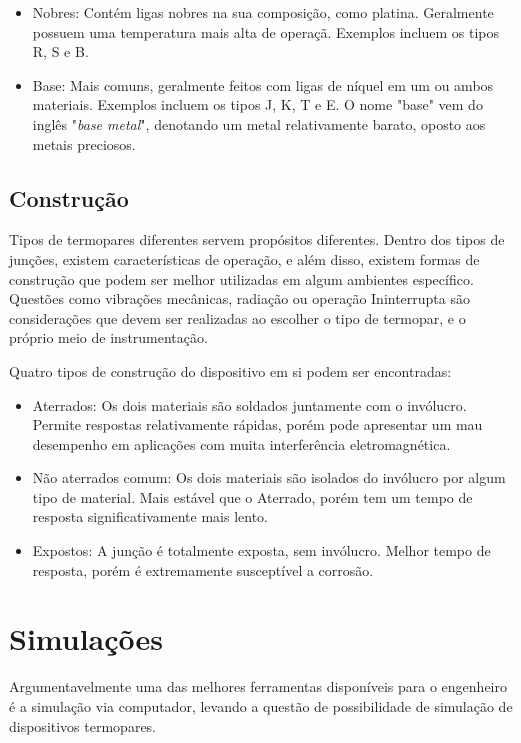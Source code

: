 \documentclass[a4paper,12pt]{report}
\begin{document}
	\begin{itemize}
		\item Nobres: Contém ligas nobres na sua composição, como platina. Geralmente possuem uma temperatura mais alta de operaçã. Exemplos incluem os tipos R, S e B.
		\item Base: Mais comuns, geralmente feitos com ligas de níquel em um ou ambos materiais. Exemplos incluem os tipos J, K, T e E. O nome "base" vem do inglês "\textit{base metal}", denotando um metal relativamente barato, oposto aos metais preciosos.
	\end{itemize}
	
	\subsection{Construção}
	
	Tipos de termopares diferentes servem propósitos diferentes. Dentro dos tipos de junções, existem características de operação, e além disso, existem formas de construção que podem ser melhor utilizadas em algum ambientes específico. Questões como vibrações mecânicas, radiação ou operação Ininterrupta são considerações que devem ser realizadas ao escolher o tipo de termopar, e o próprio meio de instrumentação.
	
	Quatro tipos de construção do dispositivo em si podem ser encontradas:
	
	\begin{itemize}
		\item Aterrados: Os dois materiais são soldados juntamente com o invólucro. Permite respostas relativamente rápidas, porém pode apresentar um mau desempenho em aplicações com muita interferência eletromagnética.
		
		\item Não aterrados comum: Os dois materiais são isolados do invólucro por algum tipo de material. Mais estável que o Aterrado, porém tem um tempo de resposta significativamente mais lento.
		
		\item Expostos: A junção é totalmente exposta, sem invólucro. Melhor tempo de resposta, porém é extremamente susceptível a corrosão.
	\end{itemize}

	\section{Simulações}
	Argumentavelmente uma das melhores ferramentas disponíveis para o engenheiro é a simulação via computador, levando a questão de possibilidade de simulação de dispositivos termopares.
	
\end{document}
